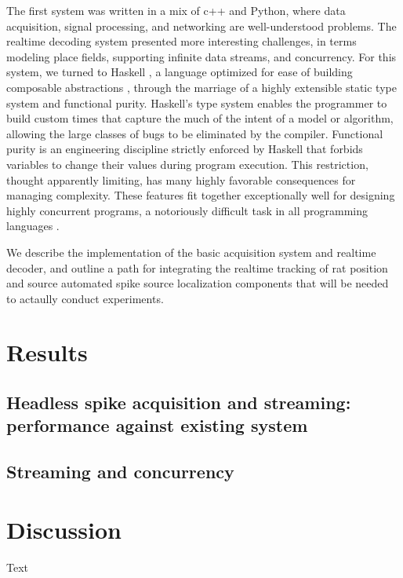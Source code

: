 \documentclass[10pt]{article}
\begin{document}
The first system was written in a mix of c++ and Python, where data acquisition, signal processing, and networking are well-understood problems. The realtime decoding system presented more interesting challenges, in terms modeling place fields, supporting infinite data streams, and concurrency. For this system, we turned to Haskell \cite{jones2003haskell}, a language optimized for ease of building composable abstractions \cite{hughes1989functional}, through the marriage of a highly extensible static type system and functional purity. Haskell's type system enables the programmer to build custom times that capture the much of the intent of a model or algorithm, allowing the large classes of bugs to be eliminated by the compiler. Functional purity is an engineering discipline strictly enforced by Haskell that forbids variables to change their values during program execution. This restriction, thought apparently limiting, has many highly favorable consequences for managing complexity. These features fit together exceptionally well for designing highly concurrent programs, a notoriously difficult task in all programming languages \cite{jones2001tackling,harris2005composable}.

We describe the implementation of the basic acquisition system and realtime decoder, and outline a path for integrating the realtime tracking of rat position and source automated spike source localization components that will be needed to actaully conduct experiments.

\section*{Results}

\subsection*{Headless spike acquisition and streaming: performance against existing system}

\subsection*{}

\subsection*{Streaming and concurrency}

\section*{Discussion}
Text
\end{document}
